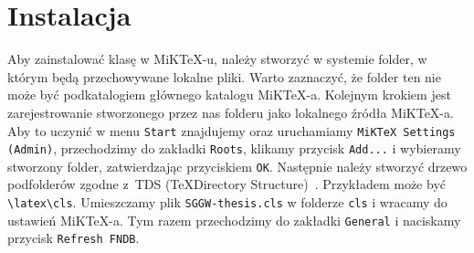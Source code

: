 \documentclass{SGGW-thesis}
\begin{document}
\section{Instalacja}
Aby zainstalować klasę w MiK\TeX-u, należy stworzyć w systemie folder, w którym będą przechowywane lokalne pliki. Warto zaznaczyć, że folder ten nie może być podkatalogiem głównego katalogu MiK\TeX-a. Kolejnym krokiem jest zarejestrowanie stworzonego przez nas folderu jako lokalnego źródła MiK\TeX-a. Aby to uczynić w menu \verb|Start| znajdujemy oraz uruchamiamy \verb|MiKTeX Settings (Admin)|, przechodzimy do zakładki \verb|Roots|, klikamy przycisk \verb|Add...| i wybieramy stworzony folder, zatwierdzając przyciskiem \verb|OK|. Następnie należy stworzyć drzewo podfolderów zgodne z~TDS (\TeX Directory Structure)~\cite{tds}. Przykładem może być \verb|\latex\cls|. Umieszczamy plik \verb|SGGW-thesis.cls| w folderze \verb|cls| i wracamy do ustawień MiK\TeX-a. Tym razem przechodzimy do zakładki \verb|General| i naciskamy przycisk \verb|Refresh FNDB|.
\end{document}
